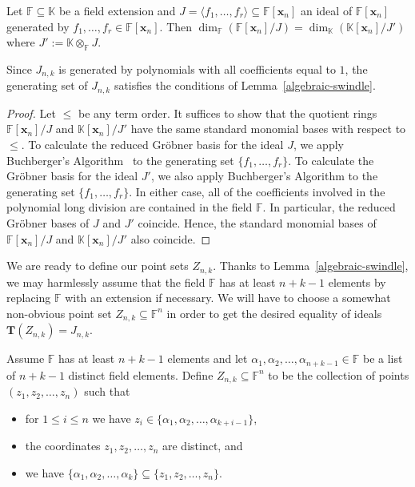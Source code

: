 \documentclass[ALCO,ThmDefs,published]{cedram}
\newcommand{\xx}{{\mathbf {x}}}
\newcommand{\FF}{{\mathbb{F}}}
\theoremstyle{plain}
\newcommand{\FF}{{\mathbb{F}}}
\newcommand{\KK}{{\mathbb{K}}}
\newcommand{\xx}{{\mathbf {x}}}
\newcommand{\TT}{{\mathbf {T}}}
\begin{document}
\begin{lemma}
\label{algebraic-swindle}
Let $\FF \subseteq \KK$ be a field extension and $J = \langle f_1, \dots, f_r \rangle \subseteq \FF[\xx_n]$ an ideal of $\FF[\xx_n]$ generated by $f_1, \dots, f_r \in \FF[\xx_n]$.  
Then $\dim_\FF ( {\FF[\xx_n]} / {J} )  = \dim_\KK ( {\KK[\xx_n]} / J' )$ where $J' := {\KK\otimes_\FF J}$.
\end{lemma}

Since $J_{n,k}$ is generated by polynomials with all coefficients equal to $1$, the generating set of $J_{n,k}$ 
satisfies the conditions of Lemma~\ref{algebraic-swindle}.

\begin{proof}
Let $\leq$ be any term order.
It suffices to show that the quotient rings ${\FF[\xx_n]} / {J}$ and ${\KK[\xx_n]} / {J'}$ have the same 
standard monomial bases with respect to $\leq$.  
To calculate the reduced Gr\"obner basis for the ideal $J$, we apply Buchberger's Algorithm~\cite[Ch. 2, \S7]{CLO} 
to the generating set $\{f_1, \dots, f_r\}$.   
To calculate the Gr\"obner basis for the ideal $J'$, we also apply Buchberger's Algorithm to the generating set
$\{f_1, \dots, f_r\}$.  In either case, all of the coefficients involved in the polynomial long division are contained in the
field $\FF$.  In particular, the reduced Gr\"obner bases of $J$ and $J'$ coincide.  Hence, the standard monomial
bases of ${\FF[\xx_n]} / {J}$ and ${\KK[\xx_n]} / {J'}$ also coincide.
\end{proof}

We are ready to define our point sets $Z_{n,k}$.  Thanks to Lemma~\ref{algebraic-swindle}, we may harmlessly
assume that 
the field $\FF$ has at least $n+k-1$ elements by replacing $\FF$ with an extension if necessary.
We will have to choose a somewhat non-obvious point set $Z_{n,k} \subseteq \FF^n$ in order to get the 
desired equality of ideals $\TT(Z_{n,k}) = J_{n,k}$.

\begin{defn}
Assume $\FF$ has at least $n+k-1$ elements and let $\alpha_1, \alpha_2, \dots, \alpha_{n+k-1} \in \FF$
be a list of $n+k-1$ distinct field elements.  Define $Z_{n,k} \subseteq \FF^n$ to be the collection of points
$(z_1, z_2, \dots, z_n)$ such that
\begin{itemize}
\item  for $1 \leq i \leq n$ we have $z_i \in \{\alpha_1, \alpha_2, \dots, \alpha_{k+i-1} \}$,
\item the coordinates $z_1, z_2, \dots, z_n$ are distinct, and
\item  we have $\{\alpha_1, \alpha_2, \dots, \alpha_k\} \subseteq \{z_1, z_2, \dots, z_n\}$.
\end{itemize}
\end{defn}
\end{document}
